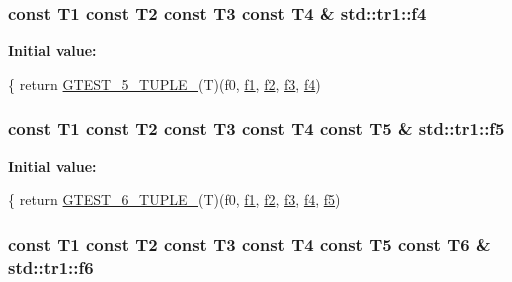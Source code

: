 \hypertarget{namespacestd_1_1tr1_adc796e02b7385d526aff708189564f67}{
\subsubsection[{f4}]{\setlength{\rightskip}{0pt plus 5cm}const T1 const T2 const T3 const T4 \& std\-::tr1\-::f4}}\label{namespacestd_1_1tr1_adc796e02b7385d526aff708189564f67}
{\bfseries Initial value\-:}
\begin{DoxyCode}
\{
  \textcolor{keywordflow}{return} \hyperlink{fused-src_2gtest_2gtest_8h_a64e6f4a4cf55f62cde94066c6d5d5c74}{GTEST\_5\_TUPLE\_}(T)(f0, \hyperlink{namespacestd_1_1tr1_a9c0fa65b105f8e2f58ba59ecf75fd000}{f1}, \hyperlink{namespacestd_1_1tr1_a87dd9e009868361317f587126dba63d4}{f2}, \hyperlink{namespacestd_1_1tr1_a0f7c3b47d27d42d82d1a333ea420ce4e}{f3}, \hyperlink{namespacestd_1_1tr1_adc796e02b7385d526aff708189564f67}{f4})
\end{DoxyCode}
\hypertarget{namespacestd_1_1tr1_a9c1eb66b2b2fa321942af95405232a0d}{
\subsubsection[{f5}]{\setlength{\rightskip}{0pt plus 5cm}const T1 const T2 const T3 const T4 const T5 \& std\-::tr1\-::f5}}\label{namespacestd_1_1tr1_a9c1eb66b2b2fa321942af95405232a0d}
{\bfseries Initial value\-:}
\begin{DoxyCode}
\{
  \textcolor{keywordflow}{return} \hyperlink{fused-src_2gtest_2gtest_8h_a53f36c86a979ed8285bf3c6f82f16483}{GTEST\_6\_TUPLE\_}(T)(f0, \hyperlink{namespacestd_1_1tr1_a9c0fa65b105f8e2f58ba59ecf75fd000}{f1}, \hyperlink{namespacestd_1_1tr1_a87dd9e009868361317f587126dba63d4}{f2}, \hyperlink{namespacestd_1_1tr1_a0f7c3b47d27d42d82d1a333ea420ce4e}{f3}, \hyperlink{namespacestd_1_1tr1_adc796e02b7385d526aff708189564f67}{f4}, \hyperlink{namespacestd_1_1tr1_a9c1eb66b2b2fa321942af95405232a0d}{f5})
\end{DoxyCode}
\hypertarget{namespacestd_1_1tr1_a6b62f32e1e3e21bceb94eb46c4cbfd56}{
\subsubsection[{f6}]{\setlength{\rightskip}{0pt plus 5cm}const T1 const T2 const T3 const T4 const T5 const T6 \& std\-::tr1\-::f6}}\label{namespacestd_1_1tr1_a6b62f32e1e3e21bceb94eb46c4cbfd56}
